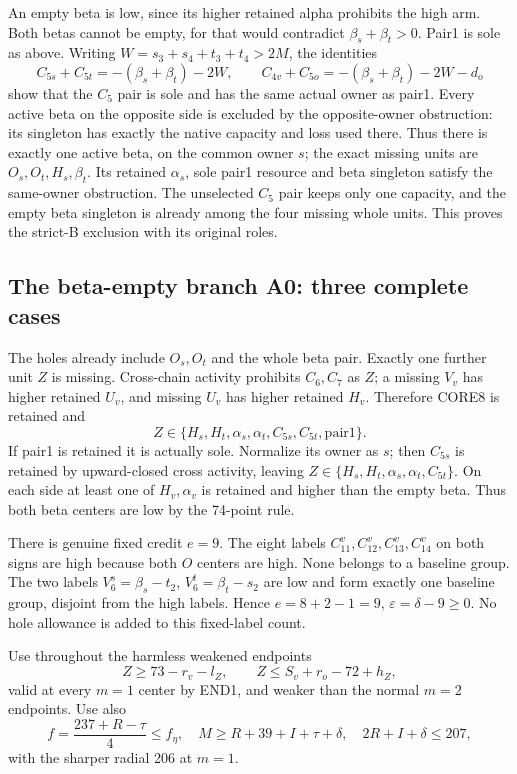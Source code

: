 \documentclass[11pt,letterpaper]{article}
\theoremstyle{definition}\newtheorem{definition}[theorem]{Definition}
\begin{document}
An empty beta is low, since its higher retained alpha prohibits the high
arm. Both betas cannot be empty, for that would contradict
$\beta_s+\beta_t>0$. Pair1 is sole as above. Writing
$W=s_3+s_4+t_3+t_4>2M$, the identities
\[
 C_{5s}+C_{5t}=-(\beta_s+\beta_t)-2W,
 \qquad C_{4v}+C_{5o}=-(\beta_s+\beta_t)-2W-d_o
\]
show that the $C_5$ pair is sole and has the same actual owner as pair1.
Every active beta on the opposite side is excluded by the opposite-owner
obstruction: its singleton has exactly the native capacity and loss used
there. Thus there is exactly one active beta, on the common owner $s$;
the exact missing units are $O_s,O_t,H_s,\beta_t$.
Its retained $\alpha_s$, sole pair1 resource and beta singleton satisfy
the same-owner obstruction. The unselected $C_5$ pair keeps only one
capacity, and the empty beta singleton is already among the four missing
whole units. This proves the strict-B exclusion with its original roles.

\subsection{The beta-empty branch A0: three complete cases}\label{subsec:p4-A0}
The holes already include $O_s,O_t$ and the whole beta pair. Exactly one
further unit $Z$ is missing. Cross-chain activity prohibits $C_6,C_7$ as
$Z$; a missing $V_v$ has higher retained $U_v$, and missing $U_v$ has
higher retained $H_v$. Therefore CORE8 is retained and
\[
 Z\in\{H_s,H_t,\alpha_s,\alpha_t,C_{5s},C_{5t},\mathrm{pair1}\}.
                                                        \tag{A0-cover}
\]
If pair1 is retained it is actually sole. Normalize its owner as $s$;
then $C_{5s}$ is retained by upward-closed cross activity, leaving
$Z\in\{H_s,H_t,\alpha_s,\alpha_t,C_{5t}\}$.
On each side at least one of $H_v,\alpha_v$ is retained and higher than
the empty beta. Thus both beta centers are low by the 74-point rule.

There is genuine fixed credit $e=9$. The eight labels
$C^v_{11},C^v_{12},C^v_{13},C^v_{14}$ on both signs are high because both
$O$ centers are high. None belongs to a baseline group.
The two labels $V^s_6=\beta_s-t_2$, $V^t_6=\beta_t-s_2$ are low and
form exactly one baseline group, disjoint from the high labels.
Hence $e=8+2-1=9$, $\varepsilon=\delta-9\ge0$.
No hole allowance is added to this fixed-label count.

Use throughout the harmless weakened endpoints
\begin{equation}
 Z\ge73-r_v-l_Z,\qquad Z\le S_v+r_o-72+h_Z,
                                                        \label{eq:p4-A0end}
\end{equation}
valid at every $m=1$ center by END1, and weaker than the normal $m=2$
endpoints. Use also
\[
 f=\frac{237+R-\tau}{4}\le f_\eta,
 \quad M\ge R+39+I+\tau+\delta,
 \quad 2R+I+\delta\le207,                         \tag{A0-source}
\]
with the sharper radial 206 at $m=1$.
\end{document}
